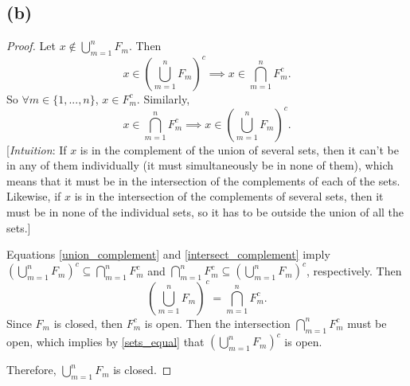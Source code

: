 \documentclass{article}
\begin{document}
\subsection*{(b)}
\begin{proof}
	Let $x \notin \bigcup_{m=1}^n F_m$. Then
	\begin{equation}\label{union_complement}
		x \in \left(\bigcup\limits_{m=1}^n F_m\right)^c \implies x \in \bigcap\limits_{m=1}^n F_m^c.
	\end{equation}
	So $\forall m \in \{1, ..., n\}$, $x\in F_m^c$. Similarly,
	\begin{equation}\label{intersect_complement}
		x \in \bigcap\limits_{m=1}^n F_m^c \implies x \in \left(\bigcup\limits_{m=1}^n F_m\right)^c. 
	\end{equation}
	[\textit{Intuition}: If $x$ is in the complement of the union of several sets, then it can't be in any of them individually (it must simultaneously be in none of them), which means that it must be in the intersection of the complements of each of the sets. Likewise, if $x$ is in the intersection of the complements of several sets, then it must be in none of the individual sets, so it has to be outside the union of all the sets.]
	
	Equations \eqref{union_complement} and \eqref{intersect_complement} imply $\left(\bigcup_{m=1}^n F_m\right)^c \subseteq \bigcap_{m=1}^n F_m^c$ and $\bigcap_{m=1}^n F_m^c \subseteq \left(\bigcup_{m=1}^n F_m\right)^c$, respectively. Then
	\begin{equation}\label{sets_equal}
		\left(\bigcup\limits_{m=1}^n F_m\right)^c = \bigcap\limits_{m=1}^n F_m^c.
	\end{equation}
	Since $F_m$ is closed, then $F_m^c$ is open. Then the intersection $\bigcap_{m=1}^n F_m^c$ must be open, which implies by \eqref{sets_equal} that $\left(\bigcup_{m=1}^n F_m\right)^c$ is open.
	
	Therefore, $\bigcup_{m=1}^n F_m$ is closed.
\end{proof}
\end{document}

